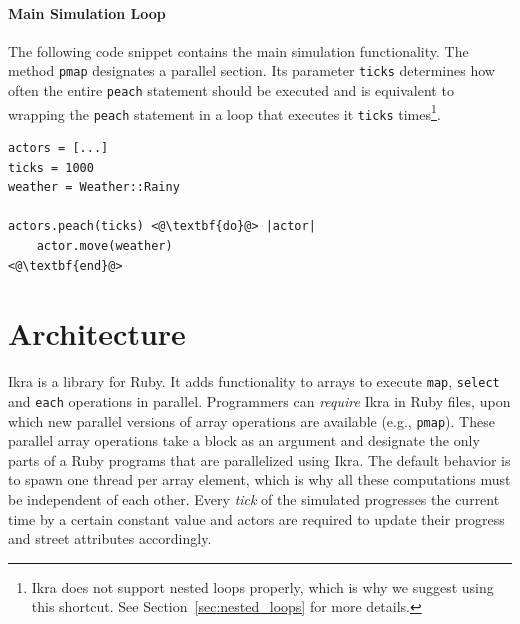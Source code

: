 \documentclass[preprint]{sigplanconf}
\begin{document}
\paragraph{Main Simulation Loop}
The following code snippet contains the main simulation functionality. The method \texttt{pmap} designates a parallel section. Its parameter \texttt{ticks} determines how often the entire \texttt{peach} statement should be executed and is equivalent to wrapping the \texttt{peach} statement in a loop that executes it \texttt{ticks} times\footnote{Ikra does not support nested loops properly, which is why we suggest using this shortcut. See Section~\ref{sec:nested_loops} for more details.}.

\begin{lstlisting}
actors = [...]
ticks = 1000
weather = Weather::Rainy

actors.peach(ticks) <@\textbf{do}@> |actor|
    actor.move(weather)
<@\textbf{end}@>
\end{lstlisting}


\section{Architecture}
Ikra is a library for Ruby. It adds functionality to arrays to execute \texttt{map}, \texttt{select} and \texttt{each} operations in parallel. Programmers can \emph{require} Ikra in Ruby files, upon which new parallel versions of array operations are available (e.g., \texttt{pmap}). These parallel array operations take a block as an argument and designate the only parts of a Ruby programs that are parallelized using Ikra. The default behavior is to spawn one thread per array element, which is why all these computations must be independent of each other. Every \emph{tick} of the simulated progresses the current time by a certain constant value and actors are required to update their progress and street attributes accordingly.
\end{document}

